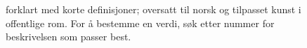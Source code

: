 \begin{figure}
\fi
\caption{ forklart med korte definisjoner; oversatt til norsk
  og tilpasset kunst i offentlige rom. 
  For å bestemme en verdi, søk etter nummer for beskrivelsen som
  passer best.}\label{fig:engagementprofile:n}
\end{figure}

